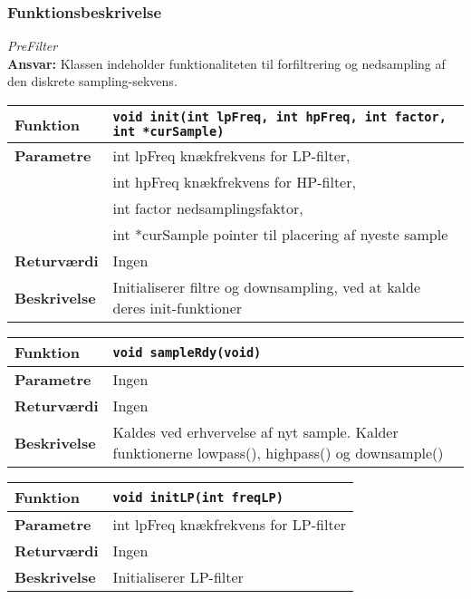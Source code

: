 \subsubsection*{Funktionsbeskrivelse}

\textit{PreFilter} \\
\textbf{Ansvar:} Klassen indeholder funktionaliteten til forfiltrering og nedsampling af den diskrete sampling-sekvens.


\begin{center}
    \begin{tabular}{ | l | p{} |}
    \hline
    \textbf{Funktion}	& \verb+void init(int lpFreq, int hpFreq, int factor, int *curSample) +						\\ \hline
    \textbf{Parametre} 	& int lpFreq knækfrekvens for LP-filter,\\&
    						  int hpFreq knækfrekvens for HP-filter,\\&
    						  int factor nedsamplingsfaktor, \\&
    						  int *curSample pointer til placering af nyeste sample		\\ \hline
    \textbf{Returværdi}	& Ingen																				\\ \hline
    \textbf{Beskrivelse}	& Initialiserer filtre og downsampling, ved at kalde deres init-funktioner		\\ \hline
    \end{tabular}
\end{center}


\begin{center}
    \begin{tabular}{ | l | p{} |}
    \hline
    \textbf{Funktion}	& \verb+void sampleRdy(void) +						\\ \hline
    \textbf{Parametre} 	& Ingen		\\ \hline
    \textbf{Returværdi}	& Ingen 								\\ \hline
    \textbf{Beskrivelse}	& Kaldes ved erhvervelse af nyt sample. Kalder funktionerne lowpass(), highpass() og downsample()		\\ \hline
    \end{tabular}
\end{center}

\begin{center}
    \begin{tabular}{ | l | p{} |}
    \hline
    \textbf{Funktion}	& \verb+void initLP(int freqLP) +						\\ \hline
    \textbf{Parametre} 	& int lpFreq knækfrekvens for LP-filter		\\ \hline
    \textbf{Returværdi}	& Ingen 								\\ \hline
    \textbf{Beskrivelse}	& Initialiserer LP-filter		\\ \hline
    \end{tabular}
\end{center}

